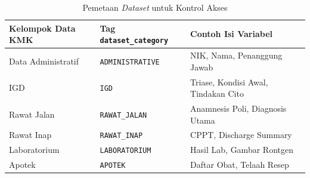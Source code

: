 \begin{table}[ht]
    \centering
    \caption{Pemetaan \textit{Dataset} untuk Kontrol Akses}
    \label{tab:mapping-dataset}
    \begin{tabular}{|>{\raggedright\arraybackslash}p{2.8cm}|>{\raggedright\arraybackslash}p{4.2cm}|>{\raggedright\arraybackslash}p{5.5cm}|}
        \hline
        \textbf{Kelompok Data KMK} & \textbf{Tag \texttt{dataset\_category}} & \textbf{Contoh Isi Variabel}        \\ \hline
        Data Administratif         & \texttt{ADMINISTRATIVE}                 & NIK, Nama, Penanggung Jawab         \\ \hline
        IGD                        & \texttt{IGD}                            & Triase, Kondisi Awal, Tindakan Cito \\ \hline
        Rawat Jalan                & \texttt{RAWAT\_JALAN}                   & Anamnesis Poli, Diagnosis Utama     \\ \hline
        Rawat Inap                 & \texttt{RAWAT\_INAP}                    & CPPT, Discharge Summary             \\ \hline
        Laboratorium               & \texttt{LABORATORIUM}                   & Hasil Lab, Gambar Rontgen           \\ \hline
        Apotek                     & \texttt{APOTEK}                         & Daftar Obat, Telaah Resep           \\ \hline
    \end{tabular}
\end{table}
